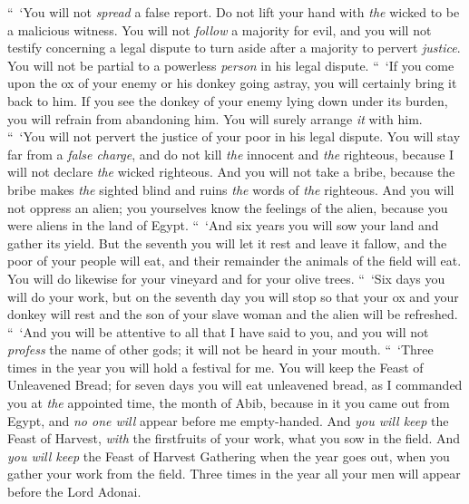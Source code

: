 \begin{biblechapter} %
 “ ‘You will not \textit{spread} a false report. Do not lift your hand with \textit{the} wicked to be a malicious witness.
\verse You will not \textit{follow} a majority for evil, and you will not testify concerning a legal dispute to turn aside after a majority to pervert \textit{justice}.
\verse You will not be partial to a powerless \textit{person} in his legal dispute.
\verse “ ‘If you come upon the ox of your enemy or his donkey going astray, you will certainly bring it back to him.
\verse If you see the donkey of your enemy lying down under its burden, you will refrain from abandoning him. You will surely arrange \textit{it} with him.
\verse “ ‘You will not pervert the justice of your poor in his legal dispute.
\verse You will stay far from a \textit{false charge}, and do not kill \textit{the} innocent and \textit{the} righteous, because I will not declare \textit{the} wicked righteous.
\verse And you will not take a bribe, because the bribe makes \textit{the} sighted blind and ruins \textit{the} words of \textit{the} righteous.
\verse And you will not oppress an alien; you yourselves know the feelings of the alien, because you were aliens in the land of Egypt.
 “ ‘And six years you will sow your land and gather its yield.
\verse But the seventh you will let it rest and leave it fallow, and the poor of your people will eat, and their remainder the animals of the field will eat. You will do likewise for your vineyard and for your olive trees.
\verse “ ‘Six days you will do your work, but on the seventh day you will stop so that your ox and your donkey will rest and the son of your slave woman and the alien will be refreshed.
\verse “ ‘And you will be attentive to all that I have said to you, and you will not \textit{profess} the name of other gods; it will not be heard in your mouth.
\verse “ ‘Three times in the year you will hold a festival for me.
\verse You will keep the Feast of Unleavened Bread; for seven days you will eat unleavened bread, as I commanded you at \textit{the} appointed time, the month of Abib, because in it you came out from Egypt, and \textit{no one will} appear before me empty-handed.
\verse And \textit{you will keep} the Feast of Harvest, \textit{with} the firstfruits of your work, what you sow in the field. And \textit{you will keep} the Feast of Harvest Gathering when the year goes out, when you gather your work from the field.
\verse Three times in the year all your men will appear before the Lord Adonai.

\end{biblechapter}
